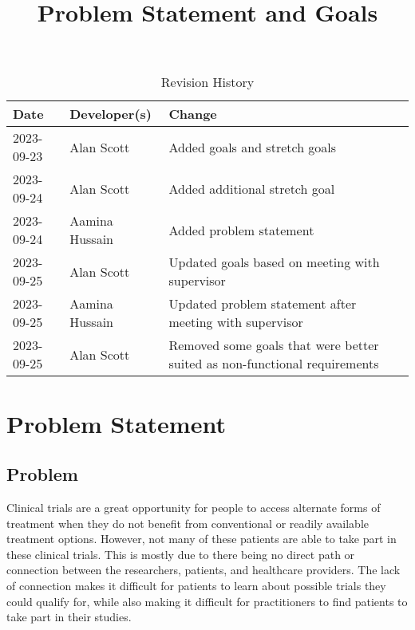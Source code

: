 \documentclass{article}
\title{Problem Statement and Goals\\\progname}
\author{\authname}
\date{}
\begin{document}
\maketitle

\begin{table}[hp]
\caption{Revision History} \label{TblRevisionHistory}
\begin{tabularx}{\textwidth}{llX}
\toprule
\textbf{Date} & \textbf{Developer(s)} & \textbf{Change}\\
\midrule
2023-09-23 & Alan Scott & Added goals and stretch goals\\
2023-09-24 & Alan Scott & Added additional stretch goal \\
2023-09-24 & Aamina Hussain & Added problem statement \\
2023-09-25 & Alan Scott & Updated goals based on meeting with supervisor \\
2023-09-25 & Aamina Hussain & Updated problem statement after meeting with supervisor \\
2023-09-25 & Alan Scott & Removed some goals that were better suited as non-functional requirements \\
\bottomrule
\end{tabularx}
\end{table}

\section{Problem Statement}


\subsection{Problem}
Clinical trials are a great opportunity for people to access alternate forms of treatment when they do not benefit 
from conventional or readily available treatment options. However, not many of these patients are able to take part 
in these clinical trials. This is mostly due to there being no direct path or connection between the researchers, patients, 
and healthcare providers. The lack of connection makes it difficult for patients to learn about possible trials they could 
qualify for, while also making it difficult for practitioners to find patients to take part in their studies.
\end{document}
